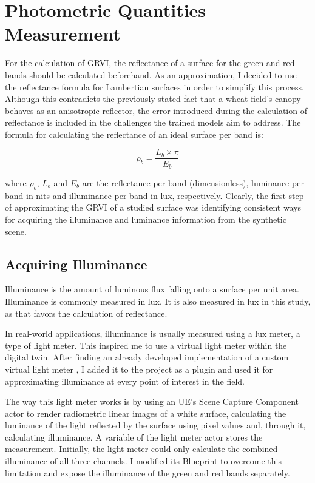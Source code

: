 \section{Photometric Quantities Measurement}
\label{photom-q-meas}

For the calculation of GRVI, the reflectance of a surface for the green and red bands should be calculated beforehand. As an approximation, I decided to use the reflectance formula for Lambertian surfaces in order to simplify this process. Although this contradicts the previously stated fact that a wheat field's canopy behaves as an anisotropic reflector, the error introduced during the calculation of reflectance is included in the challenges the trained models aim to address. The formula for calculating the reflectance of an ideal surface per band is:

\begin{equation}
    \rho_b = \frac{L_b \times \pi}{E_b}
    \label{lambertian}
\end{equation}

where $\rho_b$, $L_b$ and $E_b$ are the reflectance per band (dimensionless), luminance per band in nits and illuminance per band in lux, respectively. Clearly, the first step of approximating the GRVI of a studied surface was identifying consistent ways for acquiring the illuminance and luminance information from the synthetic scene.

\subsection{Acquiring Illuminance}

Illuminance is the amount of luminous flux falling onto a surface per unit area. Illuminance is commonly measured in lux. It is also measured in lux in this study, as that favors the calculation of reflectance.

In real-world applications, illuminance is usually measured using a lux meter, a type of light meter. This inspired me to use a virtual light meter within the digital twin. After finding an already developed implementation of a custom virtual light meter \cite{weiss_2025_lightmeter}, I added it to the project as a plugin and used it for approximating illuminance at every point of interest in the field.

The way this light meter works is by using an UE's Scene Capture Component actor to render radiometric linear images of a white surface, calculating the luminance of the light reflected by the surface using pixel values and, through it, calculating illuminance. A variable of the light meter actor stores the measurement. Initially, the light meter could only calculate the combined illuminance of all three channels. I modified its Blueprint to overcome this limitation and expose the illuminance of the green and red bands separately.


